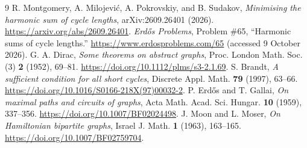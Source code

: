 \documentclass[11pt,letterpaper]{article}
\begin{document}
\begin{thebibliography}{9}
R. Montgomery, A. Milojevi\'c, A. Pokrovskiy, and B. Sudakov,
\emph{Minimising the harmonic sum of cycle lengths},
arXiv:2609.26401 (2026).
\url{https://arxiv.org/abs/2609.26401}.
\emph{Erd\H{o}s Problems}, Problem \#65, ``Harmonic sums of cycle lengths.''
\url{https://www.erdosproblems.com/65} (accessed 9 October 2026).
G. A. Dirac,
\emph{Some theorems on abstract graphs},
Proc. London Math. Soc. (3) \textbf{2} (1952), 69--81.
\url{https://doi.org/10.1112/plms/s3-2.1.69}.
S. Brandt, \emph{A sufficient condition for all short cycles},
Discrete Appl. Math. \textbf{79} (1997), 63--66.
\url{https://doi.org/10.1016/S0166-218X(97)00032-2}.
P. Erd\H{o}s and T. Gallai,
\emph{On maximal paths and circuits of graphs},
Acta Math. Acad. Sci. Hungar. \textbf{10} (1959), 337--356.
\url{https://doi.org/10.1007/BF02024498}.
J. Moon and L. Moser, \emph{On Hamiltonian bipartite graphs},
Israel J. Math. \textbf{1} (1963), 163--165.
\url{https://doi.org/10.1007/BF02759704}.
\end{thebibliography}
\end{document}
